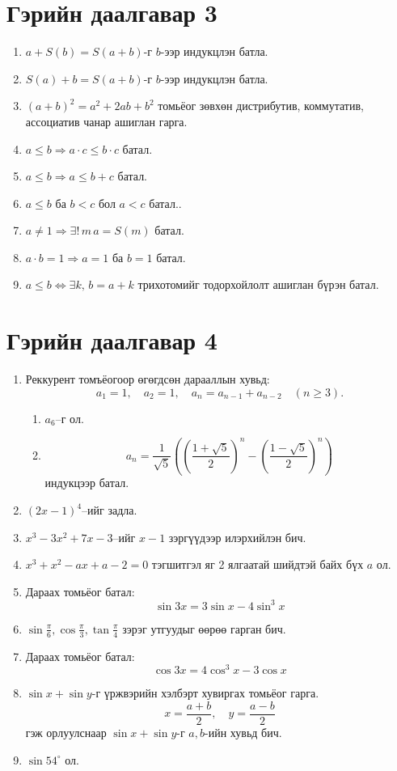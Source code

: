 \section{Гэрийн даалгавар 3}
\begin{enumerate}
  \item $a+S(b)=S(a+b)$-г $b$-ээр индукцлэн батла.
  \item $S(a)+b=S(a+b)$-г $b$-ээр индукцлэн батла.
  \item $(a+b)^2=a^2+2ab+b^2$ томьёог зөвхөн дистрибутив, коммутатив, ассоциатив чанар ашиглан гарга.
  \item $a\le b\Rightarrow a\cdot c\le b\cdot c$ батал.
  \item $a\le b\Rightarrow a\le b+ c$ батал.
  \item $a\le b$ ба $b<c$ бол $a<c$ батал..
  \item $a\ne 1\Rightarrow \exists!\,m\, a=S(m)$ батал.
  \item $a\cdot b=1\Rightarrow a=1$ ба $b=1$ батал.
  \item $a\le b\iff \exists k,\, b=a+k$ трихотомийг тодорхойлолт ашиглан бүрэн батал.
\end{enumerate}
\newpage
\section{Гэрийн даалгавар 4}
\begin{enumerate}
     \item Реккурент томъёогоор өгөгдсөн дарааллын хувьд:
  \[
    a_1 = 1,\quad a_2 = 1,\quad a_n = a_{n-1} + a_{n-2} \quad (n \geq 3).
  \]
  \begin{enumerate}
    \item $a_6$–г ол.
    \item \[
a_n = \frac{1}{\sqrt{5}} \left( \left( \frac{1+\sqrt{5}}{2} \right)^n - \left( \frac{1-\sqrt{5}}{2} \right)^n \right)
\] индукцээр батал.
\end{enumerate}
\item $(2x - 1)^4$–ийг задла.
\item $x^3 - 3x^2 + 7x - 3$–ийг $x-1$ зэргүүдээр илэрхийлэн бич.
\item $x^3 + x^2 - ax + a-2=0$ тэгшитгэл яг 2 ялгаатай шийдтэй байх бүх $a$ ол.
\item Дараах томьёог батал:
\[
\sin 3x = 3 \sin x - 4 \sin^3 x
\]
\item $\sin \frac{\pi}{6}, \cos \frac{\pi}{3}, \tan \frac{\pi}{4}$ зэрэг утгуудыг өөрөө гарган бич.
\item Дараах томьёог батал: \[
\cos 3x = 4 \cos^3 x - 3 \cos x
\]
\item \(\sin x + \sin y\)-г үржвэрийн хэлбэрт хувиргах томьёог гарга. 
\[
x = \frac{a+b}{2}, \quad y = \frac{a-b}{2}
\]
гэж орлуулснаар \(\sin x + \sin y\)-г \(a, b\)-ийн хувьд бич.
\item $\sin 54^{\circ}$ ол.
\end{enumerate}
\newpage
